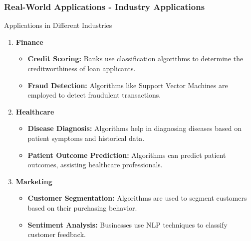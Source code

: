 \documentclass{beamer}
\begin{document}
\begin{frame}[fragile]
    \frametitle{Real-World Applications - Industry Applications}
    \begin{block}{Applications in Different Industries}
        \begin{enumerate}
            \item \textbf{Finance}
                \begin{itemize}
                    \item \textbf{Credit Scoring:} Banks use classification algorithms to determine the creditworthiness of loan applicants.
                    \item \textbf{Fraud Detection:} Algorithms like Support Vector Machines are employed to detect fraudulent transactions.
                \end{itemize}
            \item \textbf{Healthcare}
                \begin{itemize}
                    \item \textbf{Disease Diagnosis:} Algorithms help in diagnosing diseases based on patient symptoms and historical data.
                    \item \textbf{Patient Outcome Prediction:} Algorithms can predict patient outcomes, assisting healthcare professionals.
                \end{itemize}
            \item \textbf{Marketing}
                \begin{itemize}
                    \item \textbf{Customer Segmentation:} Algorithms are used to segment customers based on their purchasing behavior.
                    \item \textbf{Sentiment Analysis:} Businesses use NLP techniques to classify customer feedback.
                \end{itemize}
        \end{enumerate}
    \end{block}
\end{frame}
\end{document}
